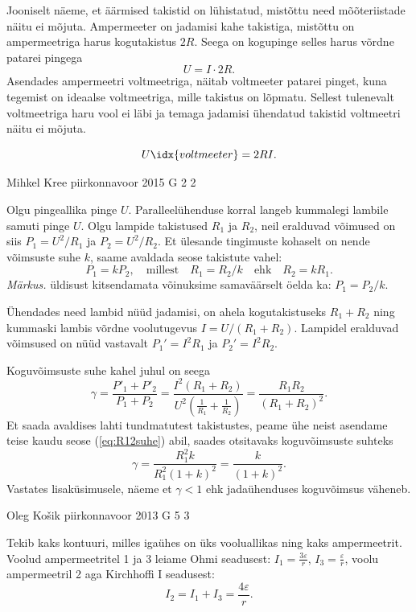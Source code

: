 \documentclass[11pt]{article}
\begin{document}
{{\ifSolution
Jooniselt näeme, et äärmised takistid on lühistatud, mistõttu need mõõteriistade näitu ei mõjuta. Ampermeeter on jadamisi kahe takistiga, mistõttu on ampermeetriga harus kogutakistus $2R$. Seega on kogupinge selles harus võrdne patarei pingega
\[ U = I\cdot 2R.\]
Asendades ampermeetri voltmeetriga, näitab voltmeeter patarei pinget, kuna tegemist on ideaalse voltmeetriga, mille takistus on lõpmatu. Sellest tulenevalt voltmeetriga haru vool ei läbi ja temaga jadamisi ühendatud takistid voltmeetri näitu ei mõjuta.

\[ U\idx{voltmeeter} = 2RI.\]
\fi
}

{Mihkel Kree} %
{piirkonnavoor} %
{2015} %
{G 2} %
{2} %
{

\ifSolution
Olgu pingeallika pinge $U$. Paralleelühenduse korral langeb kummalegi lambile samuti pinge $U$. Olgu lampide takistused $R_1$ ja $R_2$, neil eralduvad võimused on siis $P_1=U^2/R_1$ ja $P_2=U^2/R_2$. Et ülesande tingimuste kohaselt on nende võimsuste suhe $k$, saame avaldada seose takistute vahel:
\begin{equation}
\label{eq:R12suhe}
P_1 = kP_2, \quad \text{millest} \quad R_1 = R_2/k \quad \text{ehk} \quad R_2=kR_1.
\end{equation}
\emph{Märkus.} üldisust kitsendamata võinuksime samaväärselt öelda ka: $P_1 = P_2/k$.

Ühendades need lambid nüüd jadamisi, on ahela kogutakistuseks $R_1+R_2$ ning kummaski lambis võrdne voolutugevus $I=U/(R_1+R_2)$. Lampidel eralduvad võimsused on nüüd vastavalt $P_1'=I^2R_1$ ja $P_2'=I^2R_2$.

Koguvõimsuste suhe kahel juhul on seega
\[
\gamma = \frac{P'_1+P'_2}{P_1+P_2} = \frac{I^2(R_1+R_2)}{U^2(\frac{1}{R_1}+\frac{1}{R_2})}=
\frac{R_1R_2}{(R_1+R_2)^2}.
\]
Et saada avaldises lahti tundmatutest takistustes, peame ühe neist asendame teise kaudu seose (\ref{eq:R12suhe}) abil, saades otsitavaks koguvõimsuste suhteks
\[
\gamma = \frac{R_1^2 k}{R_1^2(1+k)^2} = \frac{k}{(1+k)^2}.
\]
Vastates lisaküsimusele, näeme et $\gamma < 1$ ehk jadaühenduses koguvõimsus väheneb.
\fi
}

{Oleg Košik} %
{piirkonnavoor} %
{2013} %
{G 5} %
{3} %
{

\ifSolution
\osa Tekib kaks kontuuri, milles igaühes on üks vooluallikas ning kaks ampermeetrit. Voolud ampermeetritel 1 ja 3 leiame Ohmi seadusest: $I_1=\frac{3\varepsilon}{r}$, $I_3=\frac{\varepsilon}{r}$, voolu ampermeetril 2 aga Kirchhoffi I seadusest: 
\[
I_2=I_1+I_3=\frac{4\varepsilon}{r}.
\]

}}
\end{document}
